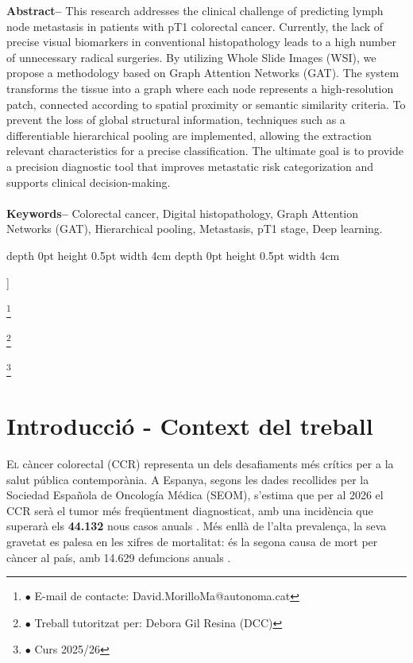 ﻿\documentclass[10pt,a4paper,twocolumn,twoside]{article}
\newcommand\blfootnote[1]{%
  \begingroup
  \renewcommand\thefootnote{}\footnote{#1}%
  \addtocounter{footnote}{-1}%
  \endgroup
}
\begin{document}
\begin{@twocolumnfalse}
\begin{center}
{\textbf{Abstract--} This research addresses the clinical challenge of predicting lymph node metastasis in patients with pT1 colorectal cancer. Currently, the lack of precise visual biomarkers in conventional histopathology leads to a high number of unnecessary radical surgeries. By utilizing Whole Slide Images (WSI), we propose a methodology based on Graph Attention Networks (GAT). The system transforms the tissue into a graph where each node represents a high-resolution patch, connected according to spatial proximity or semantic similarity criteria. To prevent the loss of global structural information, techniques such as a differentiable hierarchical pooling are implemented, allowing the extraction relevant characteristics for a precise classification. The ultimate goal is to provide a precision diagnostic tool that improves metastatic risk categorization and supports clinical decision-making.
\\
\\
\textbf{Keywords-- } Colorectal cancer, Digital histopathology, Graph Attention Networks (GAT), Hierarchical pooling, Metastasis, pT1 stage, Deep learning.\\
}

\bigskip

{\vrule depth 0pt height 0.5pt width 4cm\hspace{7.5pt}%
%
\hspace{7.5pt}\vrule depth 0pt height 0.5pt width 4cm\relax}

\end{center}

\bigskip
\end{@twocolumnfalse}]

\blfootnote{$\bullet$ E-mail de contacte: David.MorilloMa@autonoma.cat}
\blfootnote{$\bullet$ Treball tutoritzat per: Debora Gil Resina (DCC)} \blfootnote{$\bullet$ Curs 2025/26}

\section{Introducció - Context del treball}

\lettrine[lines=3]{E}{l} càncer colorectal (CCR) representa un dels desafiaments més crítics per a la salut pública contemporània. A Espanya, segons les dades recollides per la Sociedad Española de Oncología Médica (SEOM), s'estima que per al 2026 el CCR serà el tumor més freqüentment diagnosticat, amb una incidència que superarà els \textbf{44.132} nous casos anuals \cite{seom2026}. Més enllà de l'alta prevalença, la seva gravetat es palesa en les xifres de mortalitat: és la segona causa de mort per càncer al país, amb 14.629 defuncions anuals \cite{seom2026}.
\end{document}
